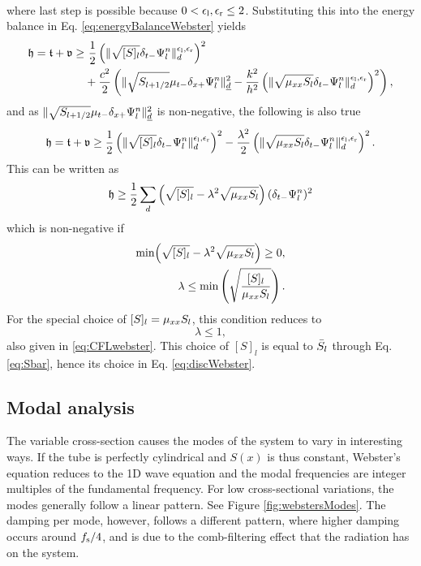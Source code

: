 {\begin{align*}
\end{align*}
where last step is possible because $0 < \epsilon_\text{l}, \epsilon_\text{r} \leq 2$.
Substituting this into the energy balance in Eq. \eqref{eq:energyBalanceWebster} yields
\begin{align*}
    \mathfrak{h} = \mathfrak{t} + \mathfrak{v} \geq &\  \frac{1}{2} \left(\lVert\sqrt{[S]_l} \delta_{t-} \Psi_l^n \rVert_d^{\epsilon_\text{l}, \epsilon_\text{r}}\right)^2 \\
    &+ \frac{c^2}{2}\left(\lVert\sqrt{S_{l+1/2}}\mu_{t-}\delta_{x+}\Psi_l^n\rVert_{\underline{d}}^2 - \frac{k^2}{h^2}\left(\lVert\sqrt{\mu_{xx} S_l}\delta_{t-}\Psi_l^n\rVert_{d}^{\epsilon_\text{l},\epsilon_\text{r}}\right)^2\right),
\end{align*}
and as $\lVert\sqrt{S_{l+1/2}}\mu_{t-}\delta_{x+}\Psi_l^n\rVert_{\underline{d}}^2$ is non-negative, the following is also true
\begin{equation*}
    \mathfrak{h} = \mathfrak{t} + \mathfrak{v} \geq \frac{1}{2} \left(\lVert\sqrt{[S]_l} \delta_{t-} \Psi_l^n \rVert_d^{\epsilon_\text{l}, \epsilon_\text{r}}\right)^2- \frac{\lambda^2}{2}\left(\lVert\sqrt{\mu_{xx} S_l}\delta_{t-}\Psi_l^n\rVert_{d}^{\epsilon_\text{l},\epsilon_\text{r}}\right)^2.
\end{equation*}
This can be written as
\begin{equation}
    \mathfrak{h} \geq \frac{1}{2} \sum_d \left(\sqrt{[S]_l} - \lambda^2\sqrt{\mu_{xx} S_l}\right)(\delta_{t-} \Psi_l^n)^2 
\end{equation}
which is non-negative if
\begin{align*}
    \text{min}\Big(\sqrt{[S]_l} - \lambda^2\sqrt{\mu_{xx} S_l}\Big) \geq 0,\\
    \lambda \leq \text{min}\left(\sqrt{\frac{[S]_l}{\mu_{xx} S_l}}\right).
\end{align*}
For the special choice of $[S]_l = \mu_{xx} S_l$, this condition reduces to
\begin{equation}
    \lambda \leq 1,
\end{equation}
also given in \eqref{eq:CFLwebster}. This choice of $[S]_l$ is equal to $\bar{S}_l$ through Eq. \eqref{eq:Sbar}, hence its choice in Eq. \eqref{eq:discWebster}.

\subsection{Modal analysis}
The variable cross-section causes the modes of the system to vary in interesting ways. If the tube is perfectly cylindrical and $S(x)$ is thus constant, Webster's equation reduces to the 1D wave equation and the modal frequencies are integer multiples of the fundamental frequency. 
For low cross-sectional variations, the modes generally follow a linear pattern. See Figure \ref{fig:webstersModes}. The damping per mode, however, follows a different pattern, where higher damping occurs around $f_\text{s}/4$, and is due to the comb-filtering effect that the radiation has on the system. 

}
